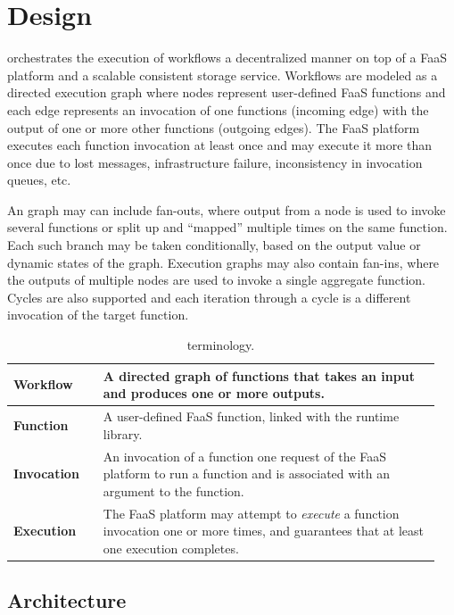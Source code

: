 \section{Design}\label{sec:design}

\name{} orchestrates the execution of workflows a decentralized manner on top of
a FaaS platform and a scalable consistent storage service. Workflows are modeled
as a directed execution graph where nodes represent user-defined FaaS functions
and each edge represents an invocation of one functions (incoming edge) with the
output of one or more other functions (outgoing edges). The FaaS platform
executes each function invocation at least once and may execute it more than
once due to lost messages, infrastructure failure, inconsistency in invocation
queues, etc.

An \name{} graph may can include fan-outs, where output from a node is used to
invoke several functions or split up and ``mapped'' multiple times on the same
function. Each such branch may be taken conditionally, based on the output value
or dynamic states of the graph. Execution graphs may also contain fan-ins, where
the outputs of multiple nodes are used to invoke a single aggregate function.
Cycles are also supported and each iteration through a cycle is a different
invocation of the target function.

\begin{table}[]
  \centering
  \begin{tabular}{|m{0.2\linewidth}|m{0.75\linewidth}|}
    \hline
	\textbf{Workflow} & A directed graph of functions that takes an input and produces one or more outputs. \\
    \hline
	\textbf{Function} & A user-defined FaaS function, linked with the \name{} runtime library. \\
    \hline
	\textbf{Invocation} & An invocation of a function one request of the FaaS platform to run a function and is associated with an argument to the function. \\
    \hline
	\textbf{Execution} & The FaaS platform may attempt to \emph{execute} a function invocation one or more times, and guarantees that at least one execution completes. \\
    \hline
  \end{tabular}
  \caption{\name{} terminology.}
  \label{table:terms}
\end{table}

\subsection{Architecture}\label{sec:design:architecture}

